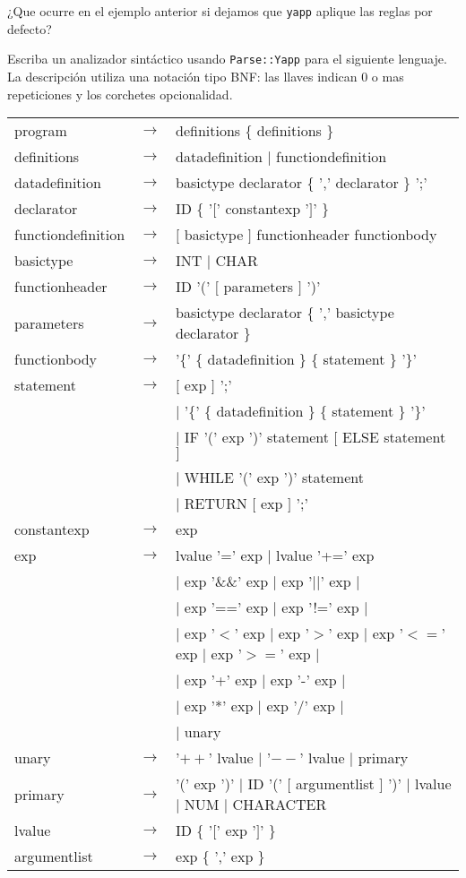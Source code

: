 \begin{exercise}
¿Que ocurre en el ejemplo anterior si dejamos que \verb|yapp| aplique 
las reglas por defecto?
\end{exercise}

\label{section:samplec}
Escriba un analizador sintáctico 
usando \verb|Parse::Yapp| para el siguiente lenguaje.
La descripción utiliza una notación tipo BNF: las llaves indican 
0 o mas repeticiones y los corchetes opcionalidad.

\vspace{0.5cm}
\begin{tabular}{lll}
program      &$\rightarrow$& definitions \{ definitions \}\\
definitions  &$\rightarrow$& datadefinition $|$ functiondefinition\\
datadefinition   &$\rightarrow$& basictype declarator \{ ',' declarator \} ';'\\
declarator  &$\rightarrow$& ID \{ '$[$' constantexp '$]$' \}\\
functiondefinition &$\rightarrow$& $[$ basictype $]$ functionheader functionbody\\
basictype    &$\rightarrow$& INT  $|$ CHAR\\
functionheader &$\rightarrow$& ID '(' $[$ parameters $]$ ')'\\
parameters &$\rightarrow$& basictype declarator \{ ',' basictype declarator \} \\
functionbody &$\rightarrow$& '\{' \{ datadefinition \} \{ statement \} '\}'\\
statement &$\rightarrow$& $[$ exp $]$ ';'\\
          &&$|$ '\{' \{ datadefinition \} \{ statement \} '\}'\\
          &&$|$  IF '(' exp ')' statement $[$ ELSE statement $]$\\
          &&$|$  WHILE '(' exp ')' statement\\
          &&$|$  RETURN $[$ exp $]$ ';'\\
constantexp  &$\rightarrow$& exp \\
exp       &$\rightarrow$& lvalue '=' exp $|$ lvalue '+=' exp \\
          &&$|$ exp '\&\&' exp $|$ exp '$||$' exp  $|$\\
          &&$|$ exp '==' exp $|$ exp '!=' exp  $|$\\
          &&$|$ exp '$<$' exp $|$ exp '$>$' exp  $|$ exp '$<=$' exp $|$ exp '$>=$' exp  $|$\\
          &&$|$ exp '+' exp $|$ exp '-' exp  $|$\\
          &&$|$ exp '*' exp $|$ exp '/' exp $|$\\
          &&$|$ unary\\
unary     &$\rightarrow$& '$++$' lvalue  $|$ '$--$' lvalue $|$ primary\\
primary   &$\rightarrow$& '(' exp ')' $|$ ID '(' $[$ argumentlist $]$ ')' $|$ lvalue $|$ NUM $|$ CHARACTER\\
lvalue   &$\rightarrow$& ID  \{ '$[$' exp '$]$' \}\\
argumentlist &$\rightarrow$& exp \{ ',' exp \}
\end{tabular}
